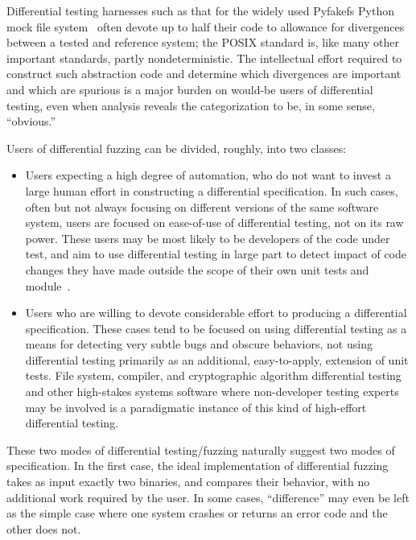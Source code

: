Differential testing harnesses such as that for the widely used Pyfakefs Python
mock file system~\cite{pyfakefs,TSTLHarness} often devote up to half their
code to allowance for divergences between a tested and reference
system; the POSIX standard is, like many other important standards,
partly nondeterministic.  The intellectual effort required to construct such
abstraction code and determine which divergences are important and
which are spurious is a major burden on would-be users of differential
testing, even when analysis reveals the categorization to be, in some
sense, ``obvious.''

Users of differential fuzzing can be divided, roughly, into two
classes:

\begin{itemize}
  \item Users expecting a high degree of automation, who do not want
    to invest a large human effort in constructing a differential specification.  In such cases, often but not always focusing on
    different versions of the same software system, users are focused
    on ease-of-use of differential testing, not on its raw power.  These users may be most likely to be developers of
    the code under test, and aim to use differential testing in large
    part to detect impact of code changes they have made outside the
    scope of their own unit tests and module~\cite{PercepDiff}.
    \item Users who are willing to devote considerable effort to
      producing a differential specification.  These cases tend to be
      focused on using differential testing as a means for detecting
      very subtle bugs and obscure behaviors, not using differential
      testing primarily as an additional, easy-to-apply, extension of
      unit tests.  File system, compiler, and cryptographic algorithm
      differential testing and other high-stakes systems software
      where non-developer testing experts may be involved is a
      paradigmatic instance of this kind of high-effort differential
      testing.
    \end{itemize}

These two modes of differential testing/fuzzing naturally suggest two
modes of specification.  In the first case, the ideal implementation
of differential fuzzing takes as input exactly two binaries, and compares
their behavior, with no additional work required by the user.  In some
cases, ``difference'' may even be left as the simple case where one
system crashes or returns an error code and the other does not.

